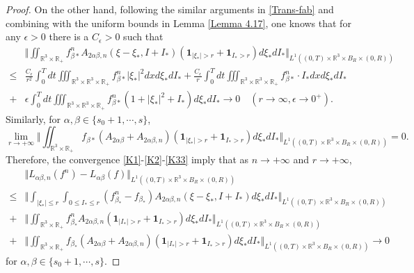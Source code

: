 \documentclass[10pt,a4paper]{amsart}
\def\R{\mathbb{R}}
\begin{document}
\begin{proof}
On the other hand, following the similar arguments in \eqref{Trans-fab} and combining with the uniform bounds in Lemma \ref{Lemma 4.17}, one knows that for any $\epsilon > 0$ there is a $C_\epsilon > 0$ such that
\begin{equation}\label{K2}
	\begin{aligned}
		&\Vert \iint_{ \R^3 \times \R_+} f^n_{ \beta *} A_{2\alpha \beta ,n}(\xi -\xi_* ,I+I_* ) ( \mathbf{1}_{|\xi_*|>r}+ \mathbf{1}_{I_*>r})d\xi_* dI_* \Vert_{L^1((0,T)\times \R^3 \times B_R \times (0,R))} \\
		\leq & \tfrac{C_\epsilon}{r^2} \int_0^T dt \iiint_{ \R^3 \times \R^3 \times \R_+} f^n_{\beta *} |\xi_*|^2 dxd\xi_* dI_*  + \tfrac{C_\epsilon}{r} \int_0^T dt \iiint_{ \R^3 \times \R^3 \times \R_+} f^n_{\beta *} \cdot I_* dxd\xi_* dI_* \\
		+ & \epsilon  \int_0^T dt \iiint_{ \R^3 \times \R^3 \times \R_+} f^n_{\beta *} (1+|\xi_*|^2+I_*) d\xi_* dI_* \rightarrow 0 \quad (r \rightarrow \infty, \epsilon \rightarrow 0^+).
	\end{aligned}
\end{equation}
Similarly, for $\alpha, \beta \in \{ s_0 + 1, \cdots, s \}$,
\begin{equation}\label{K33}
	\lim_{r \to + \infty} \Vert \iint_{ \R^3 \times \R_+} f_{ \beta *} (A_{2\alpha \beta }+ A_{2\alpha \beta,n }) ( \mathbf{1}_{|\xi_*|>r}+ \mathbf{1}_{I_*>r})d\xi_* dI_* \Vert_{L^1((0,T)\times \R^3 \times B_R \times (0,R))} = 0.
\end{equation}
Therefore, the convergence \eqref{K1}-\eqref{K2}-\eqref{K33} imply that as $n \to + \infty$ and $r \to + \infty$,
\begin{equation}\label{K4}
	\begin{aligned}
		&\Vert L_{ \alpha \beta ,n} (f^n ) -L_{ \alpha \beta} (f) \Vert_{L^1((0,T)\times \R^3 \times B_R \times (0,R))}\\
		\leq &\Vert \int_{|\xi_* |\leq r} \int_{0\leq I_* \leq r} (f^n_{ \beta_*}-f_{\beta_*}) A_{2\alpha \beta ,n}(\xi -\xi_* ,I+I_* ) d\xi_* dI_*  \Vert_{L^1((0,T)\times \R^3 \times B_R \times (0,R))} \\
		+&\Vert \iint_{ \R^3 \times \R_+} f^n_{ \beta_*} A_{2\alpha \beta ,n} ( \mathbf{1}_{|I_*|>r}+ \mathbf{1}_{I_*>r})d\xi_* dI_* \Vert_{L^1((0,T)\times \R^3 \times B_R \times (0,R))} \\
		+& \Vert \iint_{ \R^3 \times \R_+} f_{ \beta_*} (A_{2\alpha \beta }+ A_{2\alpha \beta,n }) ( \mathbf{1}_{|I_*|>r}+ \mathbf{1}_{I_*>r})d\xi_* dI_* \Vert_{L^1((0,T)\times \R^3 \times B_R \times (0,R))} \rightarrow 0 
	\end{aligned}
\end{equation}
for $\alpha, \beta \in \{ s_0 + 1, \cdots, s \}$.


\end{proof}
\end{document}
